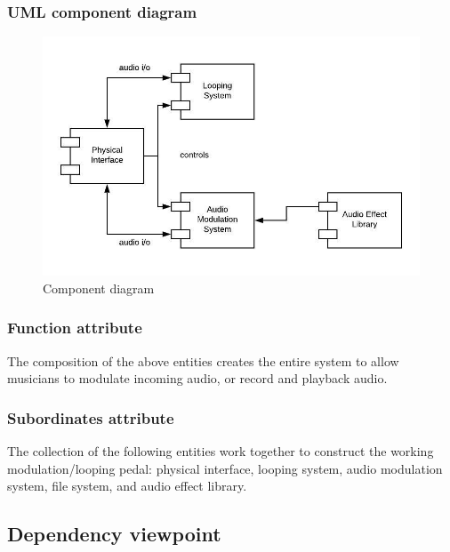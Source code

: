     \subsubsection{UML component diagram}
        \begin{figure}[!ht]
            \centering
            \includegraphics{diagrams/component-diagram-revised.jpeg}
            \caption{Component diagram}
            \label{fig:component}
        \end{figure}
    \subsubsection{Function attribute}
        The composition of the above entities creates the entire system to allow musicians to modulate incoming audio, or record and playback audio.
        
    \subsubsection{Subordinates attribute}
        The collection of the following entities work together to construct the working modulation/looping pedal: physical interface, looping system, audio modulation system, file system, and audio effect library.
\clearpage
\subsection{Dependency viewpoint}

